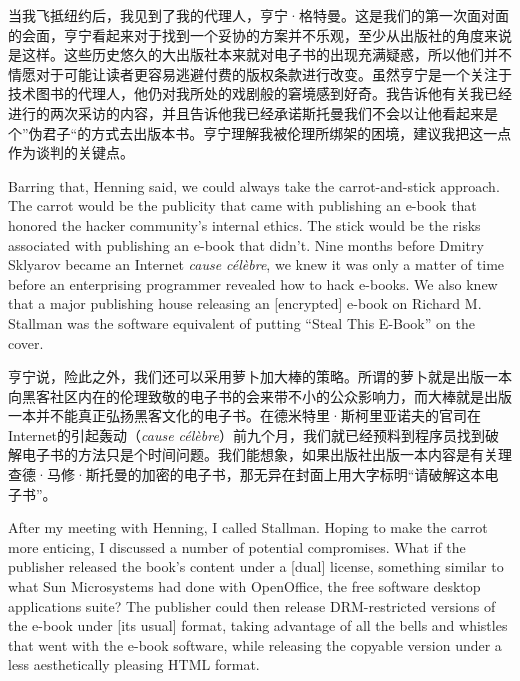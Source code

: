 \ifdefined\chs
当我飞抵纽约后，我见到了我的代理人，亨宁·格特曼。这是我们的第一次面对面的会面，亨宁看起来对于找到一个妥协的方案并不乐观，至少从出版社的角度来说是这样。这些历史悠久的大出版社本来就对电子书的出现充满疑惑，所以他们并不情愿对于可能让读者更容易逃避付费的版权条款进行改变。虽然亨宁是一个关注于技术图书的代理人，他仍对我所处的戏剧般的窘境感到好奇。我告诉他有关我已经进行的两次采访的内容，并且告诉他我已经承诺斯托曼我们不会以让他看起来是个”伪君子“的方式去出版本书。亨宁理解我被伦理所绑架的困境，建议我把这一点作为谈判的关键点。
\fi

\ifdefined\eng
Barring that, Henning said, we could always take the carrot-and-stick approach. The carrot would be the publicity that came with publishing an e-book that honored the hacker community's internal ethics. The stick would be the risks associated with publishing an e-book that didn't. Nine months before Dmitry Sklyarov became an Internet \textit{cause célèbre}, we knew it was only a matter of time before an enterprising programmer revealed how to hack e-books. We also knew that a major publishing house releasing an [encrypted] e-book on Richard M. Stallman was the software equivalent of putting ``Steal This E-Book'' on the cover.
\fi

\ifdefined\chs
亨宁说，险此之外，我们还可以采用萝卜加大棒的策略。所谓的萝卜就是出版一本向黑客社区内在的伦理致敬的电子书的会来带不小的公众影响力，而大棒就是出版一本并不能真正弘扬黑客文化的电子书。在德米特里·斯柯里亚诺夫的官司在Internet的引起轰动（\textit{cause célèbre}）前九个月，我们就已经预料到程序员找到破解电子书的方法只是个时间问题。我们能想象，如果出版社出版一本内容是有关理查德·马修·斯托曼的加密的电子书，那无异在封面上用大字标明“请破解这本电子书”。
\fi

\ifdefined\eng
After my meeting with Henning, I called Stallman. Hoping to make the carrot more enticing, I discussed a number of potential compromises. What if the publisher released the book's content under a [dual] license, something similar to what Sun Microsystems had done with OpenOffice, the free software desktop applications suite? The publisher could then release DRM-restricted versions of the e-book under [its usual] format, taking advantage of all the bells and whistles that went with the e-book software, while releasing the copyable version under a less aesthetically pleasing HTML format.
\fi

